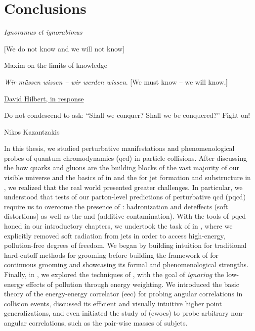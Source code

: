 \chapter{Conclusions}
\label{sec:Conclusions}

\epigraph{
    \textit{Ignoramus et ignorabimus}

    [We do not know and we will not know]
}{
    Maxim on the limits of knowledge
}

\epigraph{
    \textit{Wir m\"ussen wissen -- wir werden wissen}.
    [We must know -- we will know.]
}{
    \href{smith-at-sfsu.net/Documents/HilbertRadio/HilbertRadio.mp3}{David Hilbert, in response}
}

\epigraph{
    Do not condescend to ask:
    ``Shall we conquer? Shall we be conquered?''
    Fight on!
}{
    Nikos Kazantzakis
}

In this thesis, we studied perturbative manifestations and phenomenological probes of quantum chromodynamics (\gls{qcd}) in particle collisions.
%
After discussing the how quarks and gluons are the building blocks of the vast majority of our visible universe and the basics of  in  and the  for jet formation and substructure in , we realized that the real world presented greater challenges.
%
In particular, we understood that tests of our parton-level predictions of perturbative \gls{qcd} (\gls{pqcd}) require us to overcome the presence of :
%
\gls{hadronization} and \gls{deteffects} (soft distortions) as well as the  and  (additive contamination).
%
With the tools of \gls{pqcd} honed in our introductory chapters, we undertook the task of  in , where we explicitly removed soft radiation from jets in order to access high-energy, pollution-free degrees of freedom.
%
We began by building intuition for traditional hard-cutoff methods for grooming before building the framework of \PIRANHA{} for continuous grooming and showcasing its formal and phenomenological strengths.
%
Finally, in , we explored the techniques of , with the goal of \textit{ignoring} the low-energy effects of pollution through energy weighting.
%
We introduced the basic theory of the energy-energy correlator (\gls{eec}) for probing angular correlations in collision events, discussed its efficient and visually intuitive higher point generalizations, and even initiated the study of  (\glspl{ewoc}) to probe arbitrary non-angular correlations, such as the pair-wise masses of subjets.


